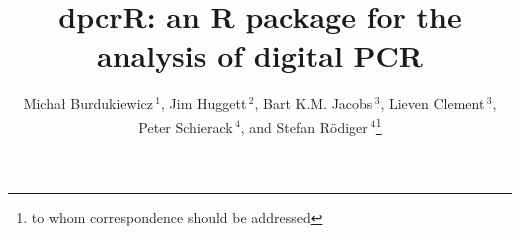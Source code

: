 \documentclass{bioinfo}
\begin{document}

\title[dpcR]{dpcrR: an R package for the analysis of digital PCR}
\author[Burdukiewicz \textit{et~al.}]{Micha\l{} Burdukiewicz\,$^{1}$, Jim Huggett\,$^2$, Bart K.M. Jacobs\,$^3$, Lieven Clement\,$^3$, Peter Schierack\,$^4$, and Stefan R\"odiger\,$^{4}$\footnote{to whom correspondence should be addressed}}
\address{$^{1}$Department of Genomics, Faculty of Biotechnology, University of 
Wroc\l{}aw, Wroc\l{}aw, Poland\\
$^{2}$Molecular and Cell Biology Team, LGC, Teddington, United Kingdom\\
$^{3}$Department of Applied Mathematics, Computer Science and Statistics, Ghent University, Belgium\\
$^{4}$Faculty of Natural Sciences, Brandenburg University of Technology 
Cottbus--Senftenberg, Germany}



\maketitle
\end{document}
